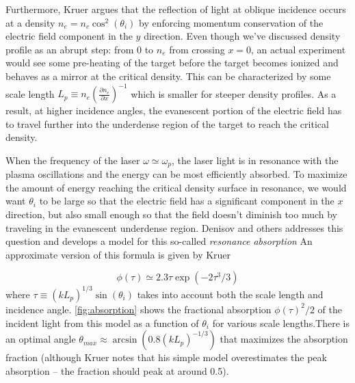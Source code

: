Furthermore, Kruer\cite{Kruer_2003_Plasma} argues that the reflection of light at oblique incidence occurs at a density $n_e = n_c \cos^2(\theta_i)$ by enforcing momentum conservation of the electric field component in the $y$ direction. Even though we've discussed density profile as an abrupt step: from 0 to $n_e$ from crossing $x = 0$, an actual experiment would see some pre-heating of the target before the target becomes ionized and behaves as a mirror at the critical density. This can be characterized by some scale length $L_p \equiv n_e (\frac{\partial n_e}{\partial x})^{-1}$ which is smaller for steeper density profiles. As a result, at higher incidence angles, the evanescent portion of the electric field has to travel further into the underdense region of the target to reach the critical density. 

When the frequency of the laser $\omega \simeq \omega_p$, the laser light is in resonance with the plasma oscillations and the energy can be most efficiently absorbed. To maximize the amount of energy reaching the critical density surface in resonance, we would want $\theta_i$ to be large so that the electric field has a significant component in the $x$ direction, but also small enough so that the field doesn't diminish too much by traveling in the evanescent underdense region. Denisov\cite{Denisov_1957_JETP} and others\cite{Forslund_1975_PRA, Freidberg_1972_PRL, Estabrook_1975_PoF} addresses this question and develops a model for this so-called \emph{resonance absorption} An approximate version of this formula is given by Kruer\cite{Kruer_2003_Plasma}

\begin{equation}
	\phi(\tau) \simeq 2.3 \tau \exp(-2 \tau^3 / 3)
\end{equation}
where $\tau \equiv (k L_p)^{1/3} \sin(\theta_i)$ takes into account both the scale length and incidence angle. \cref{fig:absorption} shows the fractional absorption $\phi(\tau)^2/2$ of the incident light from this model as a function of $\theta_i$ for various scale lengths.There is an optimal angle $\theta_{max} \approx \arcsin(0.8 (k L_p)^{-1/3})$ that maximizes the absorption fraction (although Kruer notes that his simple model overestimates the peak absorption -- the  fraction should peak at around 0.5\cite{Kruer_2003_Plasma}). 

